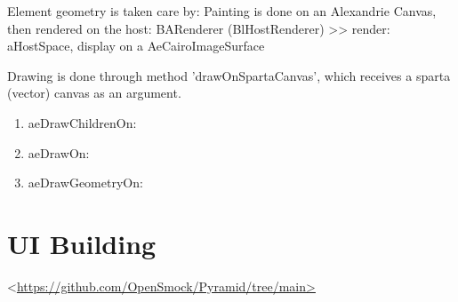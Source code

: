 \documentclass[10pt,twoside,english]{_support/latex/sbabook/sbabook}
\begin{document}
Element geometry is taken care by:
Painting is done on an Alexandrie Canvas, then rendered on the host:
BARenderer (BlHostRenderer) \textgreater{}\textgreater{} render: aHostSpace, display on a AeCairoImageSurface

Drawing is done through method 'drawOnSpartaCanvas', which receives a sparta
(vector) canvas as an argument.

\begin{enumerate}
    \item aeDrawChildrenOn:
    \item aeDrawOn:
    \item aeDrawGeometryOn:
\end{enumerate}

\section{UI Building}
\textless{}\href{https://github.com/OpenSmock/Pyramid/tree/main>}{https://github.com/OpenSmock/Pyramid/tree/main\textgreater{}}






\backmatter

\end{document}
